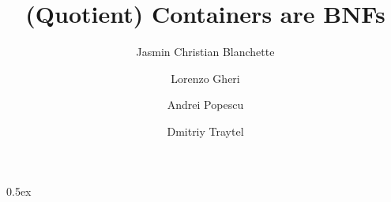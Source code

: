 \documentclass[11pt,a4paper]{article}
\begin{document}
\title{(Quotient) Containers are BNFs}
\author{Jasmin Christian Blanchette \and Lorenzo Gheri \and Andrei Popescu \and Dmitriy Traytel}
\maketitle

\parindent 0pt\parskip 0.5ex


\end{document}
